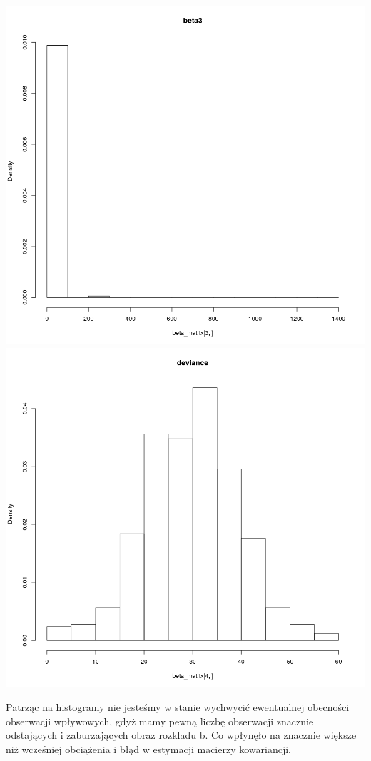 \documentclass[a4paper,11pt]{article}
\begin{document}
\includegraphics[scale=.35]{beta43_3.png} 
\includegraphics[scale=.35]{deviance_43.png} 

Patrząc na histogramy nie jesteśmy w stanie wychwycić ewentualnej obecności obserwacji wpływowych, gdyż mamy pewną liczbę obserwacji znacznie odstających i zaburzających obraz rozkladu b. Co wpłynęło na znacznie większe niż wcześniej obciążenia i błąd w estymacji macierzy kowariancji. 
\end{document}
